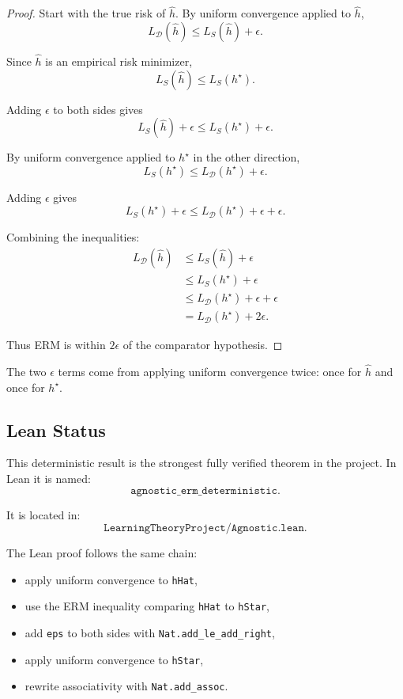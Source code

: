 \documentclass[11pt]{article}
\newcommand{\Ddist}{\mathcal{D}}
\newcommand{\LD}{L_{\Ddist}}
\newcommand{\LS}{L_S}
\newcommand{\hh}{\widehat{h}}
\newcommand{\hstar}{h^\star}
\newcommand{\eps}{\epsilon}
\theoremstyle{definition}
\begin{document}
\begin{proof}
Start with the true risk of $\hh$. By uniform convergence applied to $\hh$,
\[
  \LD(\hh)\le \LS(\hh)+\eps.
\]

Since $\hh$ is an empirical risk minimizer,
\[
  \LS(\hh)\le \LS(\hstar).
\]

Adding $\eps$ to both sides gives
\[
  \LS(\hh)+\eps\le \LS(\hstar)+\eps.
\]

By uniform convergence applied to $\hstar$ in the other direction,
\[
  \LS(\hstar)\le \LD(\hstar)+\eps.
\]

Adding $\eps$ gives
\[
  \LS(\hstar)+\eps
  \le
  \LD(\hstar)+\eps+\eps.
\]

Combining the inequalities:
\[
\begin{aligned}
  \LD(\hh)
  &\le \LS(\hh)+\eps \\
  &\le \LS(\hstar)+\eps \\
  &\le \LD(\hstar)+\eps+\eps \\
  &= \LD(\hstar)+2\eps.
\end{aligned}
\]

Thus ERM is within $2\eps$ of the comparator hypothesis.
\end{proof}

The two $\eps$ terms come from applying uniform convergence twice: once for
$\hh$ and once for $\hstar$.

\subsection{Lean Status}

This deterministic result is the strongest fully verified theorem in the
project. In Lean it is named:
\[
  \texttt{agnostic\_erm\_deterministic}.
\]

It is located in:
\[
  \texttt{LearningTheoryProject/Agnostic.lean}.
\]

The Lean proof follows the same chain:
\begin{itemize}[leftmargin=*]
  \item apply uniform convergence to \texttt{hHat},
  \item use the ERM inequality comparing \texttt{hHat} to \texttt{hStar},
  \item add \texttt{eps} to both sides with \texttt{Nat.add\_le\_add\_right},
  \item apply uniform convergence to \texttt{hStar},
  \item rewrite associativity with \texttt{Nat.add\_assoc}.
\end{itemize}
\end{document}
